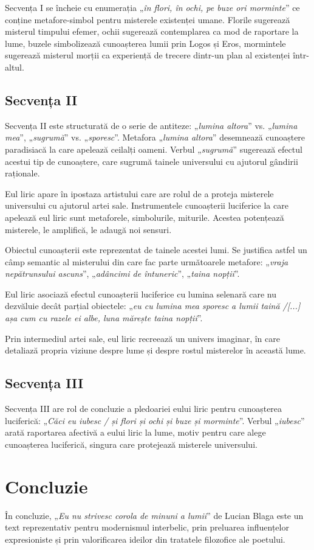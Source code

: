 \documentclass{article}
\newcommand{\qu}[1]{„\emph{#1}”}
\begin{document}
Secvența I se încheie cu enumerația \qu{în flori, în ochi, pe buze ori morminte} ce conține metafore-simbol pentru misterele existenței umane. Florile sugerează misterul timpului efemer, ochii sugerează contemplarea ca mod de raportare la lume, buzele simbolizează cunoașterea lumii prin Logos și Eros, mormintele sugerează misterul morții ca experiență de trecere dintr-un plan al existenței într-altul.

\subsection{Secvența II}
Secvența II este structurată de o serie de antiteze: \qu{lumina altora} vs. \qu{lumina mea}, \qu{sugrumă} vs. \qu{sporesc}. Metafora \qu{lumina altora} desemnează cunoaștere paradisiacă la care apelează ceilalți oameni. Verbul \qu{sugrumă} sugerează efectul acestui tip de cunoaștere, care sugrumă tainele universului cu ajutorul gândirii raționale.

Eul liric apare în ipostaza artistului care are rolul de a proteja misterele universului cu ajutorul artei sale. Instrumentele cunoașterii luciferice la care apelează eul liric sunt metaforele, simbolurile, miturile. Acestea potențează misterele, le amplifică, le adaugă noi sensuri.

Obiectul cunoașterii este reprezentat de tainele acestei lumi. Se justifica astfel un câmp semantic al misterului din care fac parte următoarele metafore: \qu{vraja nepătrunsului ascuns}, \qu{adâncimi de întuneric}, \qu{taina nopții}.

Eul liric asociază efectul cunoașterii luciferice cu lumina selenară care nu dezvăluie decât parțial obiectele: \qu{eu cu lumina mea sporesc a lumii taină /[...] așa cum cu razele ei albe, luna mărește taina nopții}.

Prin intermediul artei sale, eul liric recreează un univers imaginar, în care detaliază propria viziune despre lume și despre rostul misterelor în această lume.

\subsection{Secvența III}
Secvența III are rol de concluzie a pledoariei eului liric pentru cunoașterea luciferică: \qu{Căci eu iubesc / și flori și ochi și buze și morminte}. Verbul \qu{iubesc} arată raportarea afectivă a eului liric la lume, motiv pentru care alege cunoașterea luciferică, singura care protejează misterele universului.

\section{Concluzie}
În concluzie, \qu{Eu nu strivesc corola de minuni a lumii} de Lucian Blaga este un text reprezentativ pentru modernismul interbelic, prin preluarea influențelor expresioniste și prin valorificarea ideilor din tratatele filozofice ale poetului.
\end{document}
